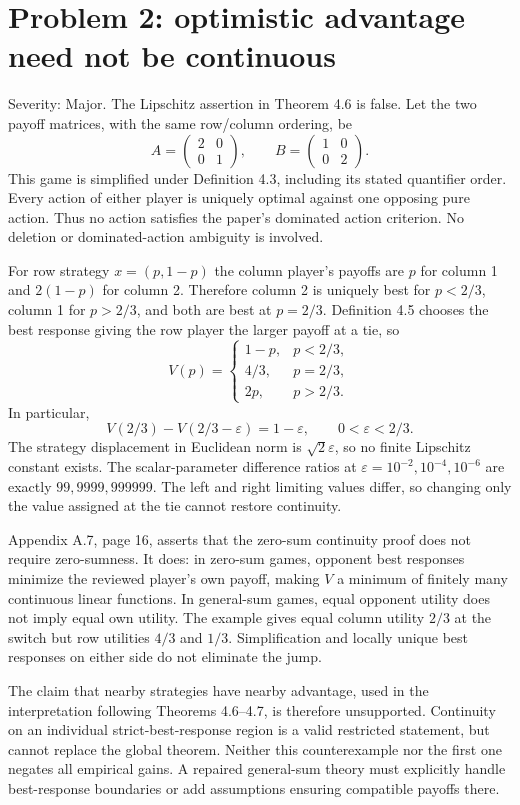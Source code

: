 \documentclass[10pt]{article}
\begin{document}
\section*{Problem 2: optimistic advantage need not be continuous}
Severity: Major. The Lipschitz assertion in Theorem 4.6 is false. Let the two payoff matrices, with the same row/column ordering, be \[A=\begin{pmatrix}2&0\\0&1\end{pmatrix},\qquad
B=\begin{pmatrix}1&0\\0&2\end{pmatrix}.\] This game is simplified under Definition 4.3, including its stated quantifier order. Every action of either player is uniquely optimal against one opposing pure action. Thus no action satisfies the paper’s dominated action criterion. No deletion or dominated-action ambiguity is involved.\par
For row strategy \(x=(p,1-p)\) the column player’s payoffs are \(p\) for column 1 and \(2(1-p)\) for column 2. Therefore column 2 is uniquely best for \(p<2/3\), column 1 for \(p>2/3\), and both are best at \(p=2/3\). Definition 4.5 chooses the best response giving the row player the larger payoff at a tie, so \[V(p)=\begin{cases}
 1-p,&p<2/3,\\
 4/3,&p=2/3,\\
 2p,&p>2/3.
 \end{cases}\] In particular, \[V(2/3)-V(2/3-\varepsilon)=1-\varepsilon,
 \qquad 0<\varepsilon<2/3.\] The strategy displacement in Euclidean norm is \(\sqrt2\varepsilon\), so no finite Lipschitz constant exists. The scalar-parameter difference ratios at \(\varepsilon=10^{-2},10^{-4},10^{-6}\) are exactly \(99,9999,999999\). The left and right limiting values differ, so changing only the value assigned at the tie cannot restore continuity.\par
Appendix A.7, page 16, asserts that the zero-sum continuity proof does not require zero-sumness. It does: in zero-sum games, opponent best responses minimize the reviewed player’s own payoff, making \(V\) a minimum of finitely many continuous linear functions. In general-sum games, equal opponent utility does not imply equal own utility. The example gives equal column utility \(2/3\) at the switch but row utilities \(4/3\) and \(1/3\). Simplification and locally unique best responses on either side do not eliminate the jump.\par
The claim that nearby strategies have nearby advantage, used in the interpretation following Theorems 4.6–4.7, is therefore unsupported. Continuity on an individual strict-best-response region is a valid restricted statement, but cannot replace the global theorem. Neither this counterexample nor the first one negates all empirical gains. A repaired general-sum theory must explicitly handle best-response boundaries or add assumptions ensuring compatible payoffs there.\par
\end{document}

